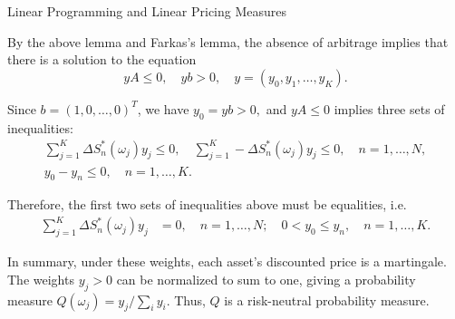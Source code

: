 \documentclass{beamer}
\begin{document}
\begin{frame}{Linear Programming and Linear Pricing Measures}

    {\footnotesize \footnotesize
     By the above lemma and Farkas's lemma, the absence of arbitrage implies that there is a solution to the equation
\[
yA \leq 0, \quad yb > 0, \quad y = (y_0, y_1, \ldots, y_K).
\]

Since $b = (1, 0, \ldots, 0)^T$, we have $y_0 = yb > 0,$ and $yA \leq 0$ implies three sets of inequalities:
\begin{gather*}
    \sum_{j=1}^{K} \Delta S_n^*(\omega_j) y_j \leq 0, \quad \sum_{j=1}^{K} - \Delta S_n^*(\omega_j) y_j \leq 0, \quad n = 1, \ldots, N, \\
    y_0 - y_n \leq 0, \quad n = 1, \ldots, K.
\end{gather*}


 \pause Therefore, the first two sets of inequalities above must be equalities, i.e.
\begin{align*}
\sum_{j=1}^{K} \Delta S_n^*(\omega_j) y_j &= 0, \quad n = 1, \ldots, N; \quad 
0 < y_0 \leq y_n, \quad n = 1, \ldots, K.
\end{align*}

In summary, under these weights, each asset's discounted price is a martingale. 
The weights $y_j > 0$ can be normalized to sum to one, 
giving a probability measure $Q(\omega_j) = y_j / \sum_i y_i$. Thus, $Q$ is a risk-neutral probability measure.


    }
\end{frame}



    
\end{document}
